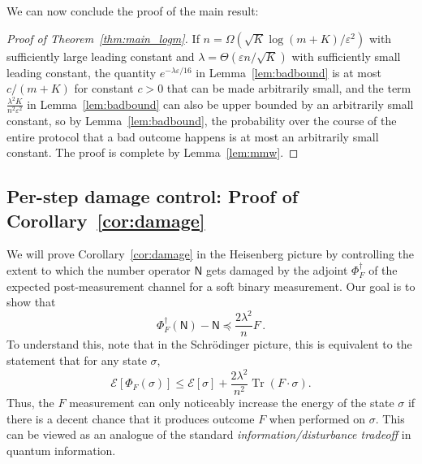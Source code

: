 \documentclass[10pt]{article}
\renewcommand{\epsilon}{\varepsilon}
\newcommand{\energy}{\mathcal{E}}
\newcommand{\luders}{\Phi}
\DeclareMathOperator{\Tr}{Tr}
\newcommand{\Id}{\mathbbm{1}}
\begin{document}
\noindent We can now conclude the proof of the main result:

\begin{proof}[Proof of Theorem~\ref{thm:main_logm}]
    If $n = \Omega(\sqrt{K}\log(m + K)/\epsilon^2)$ with sufficiently large leading constant and  $\lambda = \Theta(\epsilon n/\sqrt{K})$ with sufficiently small leading constant, the quantity $e^{-\lambda\epsilon/16}$ in Lemma~\ref{lem:badbound} is at most $c/(m+K)$ for constant $c > 0$ that can be made arbitrarily small, and the term $\frac{\lambda^2 K}{n^2\epsilon^2}$ in Lemma~\ref{lem:badbound} can also be upper bounded by an arbitrarily small constant, so by Lemma~\ref{lem:badbound}, the probability over the course of the entire protocol that a bad outcome happens is at most an arbitrarily small constant. The proof is complete by Lemma~\ref{lem:mmw}.
\end{proof}


\subsection{Per-step damage control: Proof of Corollary~\ref{cor:damage}}
\label{sec:perstep}

We will prove Corollary~\ref{cor:damage} in the Heisenberg picture by controlling the extent to which the number operator $\mathsf{N}$ gets damaged by the adjoint $\luders^\dagger_F$ of the expected post-measurement channel for a soft binary measurement. Our goal is to show that
\begin{equation}
    \luders_F^\dagger(\mathsf{N}) - \mathsf{N} \preceq \frac{2\lambda^2}{n}F\,.
\end{equation}
To understand this, note that in the Schrödinger picture, this is equivalent to the statement that for any state $\sigma$,
\begin{equation*}
    \energy[\luders_F(\sigma)] \leq \energy[\sigma] + \frac{2\lambda^2}{n^2} \Tr(F \cdot \sigma).
\end{equation*}
Thus, the $F$ measurement can only noticeably increase the energy of the state $\sigma$ if there is a decent chance that it produces outcome $F$ when performed on $\sigma$.
This can be viewed as an analogue of the standard \emph{information/disturbance tradeoff} in quantum information.
\end{document}
